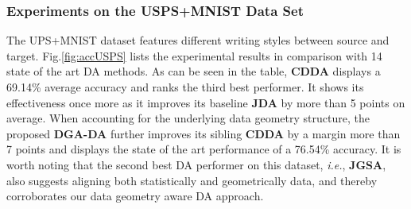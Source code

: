 \documentclass[journal,twocolumn]{IEEEtran}
\begin{document}
\begin{CJK*}{UTF8}{gkai}






    

    
\subsubsection{\textbf{Experiments on the USPS+MNIST Data Set}}
\label{subsubsection: experiments on the UPS+MNIST Datasets}
The UPS+MNIST dataset features different writing styles between source and target. Fig.\ref{fig:accUSPS} lists the experimental results in comparison with 14 state of the art DA methods. As can be seen in the table, \textbf{CDDA} displays a 69.14\% average accuracy and ranks the third best performer. It shows its effectiveness once more as it improves its baseline \textbf{JDA} by more than 5 points on average. When accounting for the underlying data geometry structure, the proposed \textbf{DGA-DA} further improves its sibling \textbf{CDDA} by a margin more than 7 points and displays the state of the art performance of a 76.54\% accuracy. It is worth noting that the second best DA performer on this dataset, \textit{i.e.}, \textbf{JGSA}, also suggests aligning both statistically and geometrically data, and thereby corroborates our data geometry aware DA approach.       


\end{CJK*}
\end{document}
